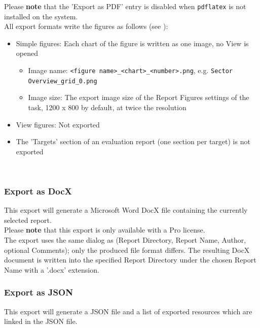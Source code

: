 Please \textbf{note} that the 'Export as PDF' entry is disabled when \texttt{pdflatex} is not installed on the system. \\

All export formats write the figures as follows (see ):

\begin{itemize}
    \item Simple figures: Each chart of the figure is written as one image, no View is opened
    \begin{itemize}
        \item Image name: \texttt{<figure name>\_<chart>\_<number>.png}, e.g. \texttt{Sector Overview\_grid\_0.png}
        \item Image size: The export image size of the Report Figures settings of the task, 1200 x 800 by default, at twice the resolution
    \end{itemize}
    \item View figures: Not exported
    \item The 'Targets' section of an evaluation report (one section per target) is not exported
\end{itemize}
\ \\

\subsubsection{Export as DocX}
\label{sec:report_export_docx}

This export will generate a Microsoft Word DocX file containing the currently selected report. \\

Please \textbf{note} that this export is only available with a Pro license. \\

The export uses the same dialog as  (Report Directory, Report Name, Author, optional Comments); only the produced file format differs. The resulting DocX document is written into the specified Report Directory under the chosen Report Name with a '.docx' extension. \\

\subsubsection{Export as JSON}
\label{sec:report_export_json}

This export will generate a JSON file and a list of exported resources which are linked in the JSON file. \\

